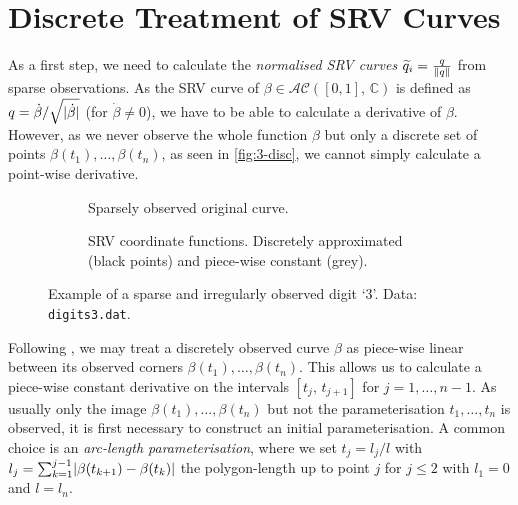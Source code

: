 \section{Discrete Treatment of SRV Curves}
\label{sec:3-discrete}
As a first step, we need to calculate the \emph{normalised SRV curves} $\widetilde q_i = \frac{q}{\lVert q\rVert}$ from sparse observations.
As the SRV curve of $\beta \in \mathcal{AC}([0,1],\,\mathbb{C})$ is defined as $q = \dot\beta / \sqrt{\lvert\dot\beta\rvert}$ (for $\dot\beta \neq 0$), we have to be able to calculate a derivative of $\beta$.
However, as we never observe the whole function $\beta$ but only a discrete set of points $\beta(t_1),\dots,\beta(t_n)$, as seen in \cref{fig:3-disc}, we cannot simply calculate a point-wise derivative.
\begin{figure}
  \centering
  \begin{subfigure}{.48\textwidth}
    \centering
    \caption{Sparsely observed original curve.}
  \end{subfigure}\hfill%
  \begin{subfigure}{.48\textwidth}
    \centering
    \begin{subfigure}[t]{\textwidth}
      \centering
    \end{subfigure}
    \begin{subfigure}{\textwidth}
      \centering
    \end{subfigure}
    \caption{SRV coordinate functions. Discretely approximated (black points) and piece-wise constant (grey).}
  \end{subfigure}
  \caption{Example of a sparse and irregularly observed digit \enquote*{3}. Data: \texttt{digits3.dat}.}
  \label{fig:3-disc-srv}
\end{figure}
Following \cite{Steyer2021}, we may treat a discretely observed curve $\beta$ as piece-wise linear between its observed corners $\beta(t_1),\dots,\beta(t_n)$.
This allows us to calculate a piece-wise constant derivative on the intervals $[t_j,\,t_{j+1}]$ for $j=1,\dots,n-1$.
As usually only the image $\beta(t_1),\dots,\beta(t_n)$ but not the parameterisation $t_1,\dots,t_n$ is observed, it is first necessary to construct an initial parameterisation.
A common choice is an \emph{arc-length parameterisation}, where we set $t_j = l_j/l$ with $l_j = \sum_{k=1}^{j-1} \lvert\beta(t_{k+1}) - \beta(t_k)\rvert$ the polygon-length up to point $j$ for $j \leq 2$ with $l_1 = 0$ and $l= l_n$.

